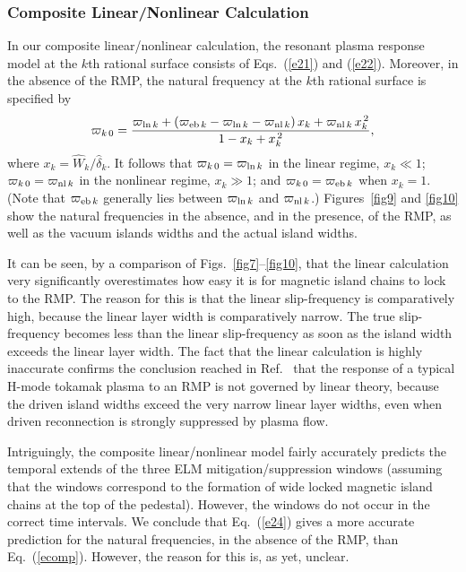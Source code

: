 \documentclass[12pt,prb,aps]{revtex4-1}
\begin{document}
\subsubsection{Composite Linear/Nonlinear Calculation}
In our composite linear/nonlinear calculation, the resonant plasma response model at the $k$th rational surface consists of Eqs.~(\ref{e21}) and (\ref{e22}).
Moreover, in the absence of the RMP, the natural frequency at the $k$th rational surface is specified
by 
\begin{equation}\label{ecomp}
\varpi_{k\,0} = \frac{\varpi_{{\rm ln}\,k} +(\varpi_{{\rm eb}\,k} -\varpi_{{\rm ln}\,k}-\varpi_{{\rm nl}\,k})\,x_k + \varpi_{{\rm nl}\,k}\,x_k^{\,2}}{1-x_k +x_k^{\,2}},
\end{equation}
where $x_k = \hat{W}_k/\hat{\delta}_k$. It follows that $\varpi_{k\,0}=\varpi_{{\rm ln}\,k}$ in the linear regime, $x_k\ll 1$;  $\varpi_{k\,0}=\varpi_{{\rm nl}\,k}$ in the nonlinear regime, $x_k\gg 1$; 
and $\varpi_{k\,0}=\varpi_{{\rm eb}\,k}$  when $x_k=1$. (Note that $\varpi_{{\rm eb}\,k}$ generally lies between $\varpi_{{\rm ln}\,k}$ and $\varpi_{{\rm nl}\,k}$.) Figures~\ref{fig9} and \ref{fig10} show the natural frequencies in the absence, and in the presence, of the RMP, as well as the vacuum
islands widths and the actual island widths. 

It can be seen, by a comparison of Figs.~\ref{fig7}--\ref{fig10}, that the linear calculation very significantly overestimates how easy it is for magnetic
island chains to lock to the RMP. The reason for this is that the linear slip-frequency is comparatively high, because the linear layer width is
comparatively narrow. The true slip-frequency becomes less than the linear slip-frequency as soon as the island width exceeds the
linear layer width. The fact that the linear calculation is highly inaccurate confirms the conclusion reached in Ref.~
that the response of a typical H-mode tokamak plasma to an RMP is not governed by linear theory, because the driven
island widths exceed the very narrow linear layer widths, even when driven reconnection is strongly suppressed by plasma flow. 

Intriguingly, the composite linear/nonlinear model fairly accurately predicts the temporal extends of the three ELM mitigation/suppression windows (assuming that the
windows correspond to the formation of wide locked magnetic island chains at the top of the pedestal). 
However, the windows do not occur in the correct time intervals. We conclude that Eq.~(\ref{e24}) gives a more accurate prediction for the
natural frequencies, in the absence of the RMP, than Eq.~(\ref{ecomp}). However, the reason for this is, as yet, unclear. 
\end{document}
